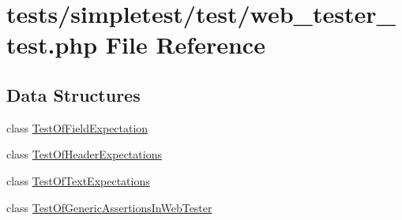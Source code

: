 \hypertarget{web__tester__test_8php}{\section{tests/simpletest/test/web\-\_\-tester\-\_\-test.php File Reference}
\label{web__tester__test_8php}
}
\subsection*{Data Structures}
\begin{DoxyCompactItemize}
\item 
class \hyperlink{class_test_of_field_expectation}{Test\-Of\-Field\-Expectation}
\item 
class \hyperlink{class_test_of_header_expectations}{Test\-Of\-Header\-Expectations}
\item 
class \hyperlink{class_test_of_text_expectations}{Test\-Of\-Text\-Expectations}
\item 
class \hyperlink{class_test_of_generic_assertions_in_web_tester}{Test\-Of\-Generic\-Assertions\-In\-Web\-Tester}
\end{DoxyCompactItemize}
